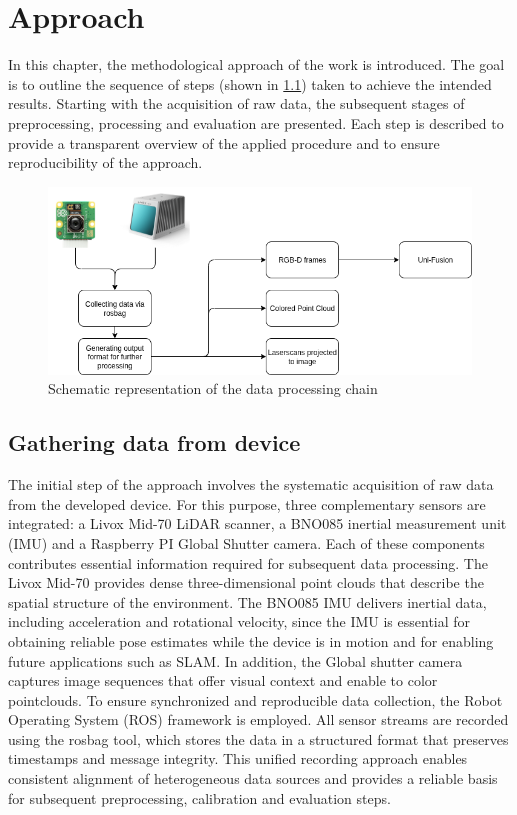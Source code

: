 \documentclass[english, bachelor, utf8]{base/thesis_telematics}
\begin{document}
\chapter{Approach}
\label{sec:approach}

In this chapter, the methodological approach of the work is introduced. The goal is to
outline the sequence of steps (shown in \ref{fig:schematic_workflow}) taken to achieve the intended results. Starting with the
acquisition of raw data, the subsequent stages of preprocessing, processing and evaluation
are presented. Each step is described to provide a transparent overview of the applied
procedure and to ensure reproducibility of the approach.

\begin{figure}[ht!]
    \centering
    \includegraphics[width=\linewidth]{pics/Approach.png}
    \caption{Schematic representation of the data processing chain}
    \label{fig:schematic_workflow}
\end{figure}

\section*{Gathering data from device}
The initial step of the approach involves the systematic acquisition of raw data from the
developed device. For this purpose, three complementary sensors are integrated: a Livox
Mid-70 LiDAR scanner, a BNO085 inertial measurement unit (IMU) and a Raspberry PI Global Shutter camera.
Each of these components contributes essential information required for subsequent data
processing. The Livox Mid-70 provides dense three-dimensional point clouds that describe
the spatial structure of the environment. The BNO085 IMU delivers inertial data, including
acceleration and rotational velocity, since the IMU is essential for obtaining reliable
pose estimates while the device is in motion and for enabling future applications such as SLAM.
In addition, the Global shutter camera captures image sequences that offer visual context
and enable to color pointclouds. To ensure synchronized and reproducible data collection, the
Robot Operating System (ROS) framework is employed. All sensor streams are recorded using
the rosbag tool, which stores the data in a structured format that preserves
timestamps and message integrity. This unified recording approach enables consistent
alignment of heterogeneous data sources and provides a reliable basis for subsequent
preprocessing, calibration and evaluation steps.
\end{document}
